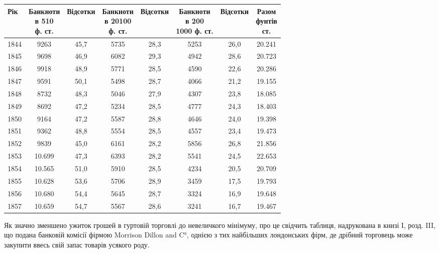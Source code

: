 
\begin{table}[h]
  \small
  \begin{tabular}{l c c c c c c c}
  \toprule
Рік  &  \makecell{Банкноти\\ в 5\textendash{}10 \\ф. ст.} & Відсотки  &
\makecell{Банкноти\\ в 20\textendash{}100\\ ф. ст.} & Відсотки  &  \makecell{Банкноти\\ в 200\textendash{}\\1000
ф. ст.} & Відсотки &   \makecell{Разом\\  фунтів \\ ст.} \\
  \midrule
1844    &     \phantom{0}9263  &  45,7  &  5735 & 28,3 & 5253 &   26,0 &   20.241\\
1845    &     \phantom{0}9698  &  46,9  &  6082 & 29,3 & 4942 &   28,6 &   20.723\\
1846    &     \phantom{0}9918  &  48,9  &  5771 & 28,5 & 4590 &   22,6 &   20.286\\
1847    &     \phantom{0}9591  &  50,1  &  5498 & 28,7 & 4066 &   21,2 &   19.155\\
1848    &     \phantom{0}8732  &  48,3  &  5046 & 27,9 & 4307 &   23,8 &   18.085\\
1849    &     \phantom{0}8692  &  47,2  &  5234 & 28,5 & 4777 &   24,3 &   18.403\\
1850    &     \phantom{0}9164  &  47,2  &  5587 & 28,8 & 4646 &   24,0 &   19.398\\
1851    &     \phantom{0}9362  &  48,8  &  5554 & 28,5 & 4557 &   23,4 &   19.473\\
1852    &     \phantom{0}9839  &  45,0  &  6161 & 28,2 & 5856 &   26,8 &   21.856\\
1853    &     10.699 &  47,3  &  6393 & 28,2 & 5541 &   24,5 &   22.653\\
1854    &     10.565 &  51,0  &  5910 & 28,5 & 4234 &   20,5 &   20.709\\
1855    &     10.628 &  53,6  &  5706 & 28,9 & 3459 &   17,5 &   19.793\\
1856    &     10.680 &  54,4  &  5645 & 28,7 & 3324 &   16,9 &   19.648\\
1857    &     10.659 &  54,7  &  5567 & 28,6 & 3241 &   16,7 &   19.467\\
\end{tabular}
\end{table}
Як значно зменшено ужиток грошей в гуртовій торговлі до невеличкого
мінімуму, про це свідчить таблиця, надрукована в книзі І, розд. III,
що подана банковій комісії фірмою Morrison Dillon and C°, однією з тих найбільших
лондонських фірм, де дрібний торговець може закупити ввесь свій запас
товарів усякого роду.

